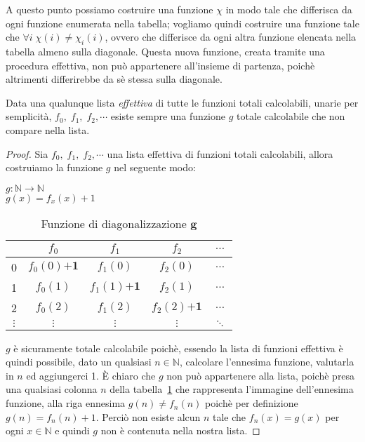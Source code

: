 A questo punto possiamo costruire una funzione $\chi$ in modo tale che
differisca da ogni funzione enumerata nella tabella; vogliamo quindi
costruire una funzione tale che $\forall i \; \chi(i) \neq
\chi_{i}(i)$, ovvero che differisce da ogni altra funzione elencata
nella tabella almeno sulla diagonale. Questa nuova funzione, creata
tramite una procedura effettiva, non può appartenere all'insieme di
partenza, poichè altrimenti differirebbe da sè stessa sulla diagonale.

\begin{proposizione}\label{TotCalcNonNum}
Data una qualunque lista \emph{effettiva} di tutte le funzioni totali
calcolabili, unarie per semplicit\`a, $f_{0},\; f_{1},\; f_{2},
\cdots$ esiste sempre una funzione $g$ totale calcolabile che non
compare nella lista.
\end{proposizione}
\begin{proof}
Sia $f_{0},\; f_{1},\; f_{2}, \cdots$ una lista effettiva di funzioni
totali calcolabili, allora costruiamo la funzione $g$ nel seguente
modo:

\begin{center}
$g: \mathbb{N} \to \mathbb{N}$\\
$g(x) = f_{x}(x) + 1$
\end{center}
\begin{table}[!h]
\begin{center}
\begin{tabular}{|c|c|c|c|c}

\hline
 & $f_0$ & $f_1$ & $f_2$ & $\ldots$\\
\hline
0 & $f_0(0) \mathbf{+1}$ & $f_1(0)$  & $f_2(0)$  & $\ldots$\\
\hline
1 & $f_0(1)$ & $f_1(1) \mathbf{+1}$  & $f_2(1)$  & $\ldots$\\
\hline
2 &  $f_0(2)$ & $f_1(2)$  & $f_2(2) \mathbf{+1}$  & $\ldots$\\
\hline
$\vdots$ & $\vdots$ &       $\vdots$  & $\vdots$  & $\ddots$\\
\end{tabular}
\end{center}
\caption{Funzione di diagonalizzazione $\mathbf{g}$}
\label{diagG}
\end{table}

$g$ è sicuramente totale calcolabile poichè, essendo la lista di
funzioni effettiva è quindi possibile, dato un qualsiasi $n \in
\mathbb{N}$, calcolare l'ennesima funzione, valutarla in $n$ ed
aggiungerci 1. È chiaro che $g$ non può appartenere alla lista, poichè
presa una qualsiasi colonna $n$ della tabella~\ref{diagG} che
rappresenta l'immagine dell'ennesima funzione, alla riga ennesima
$g(n) \neq f_{n}(n)$ poichè per definizione $g(n)=f_{n}(n)+1$. Perciò
non esiste alcun $n$ tale che $f_{n}(x)=g(x)$ per ogni $x \in
\mathbb{N}$ e quindi $g$ non è contenuta nella nostra lista.
\end{proof}

